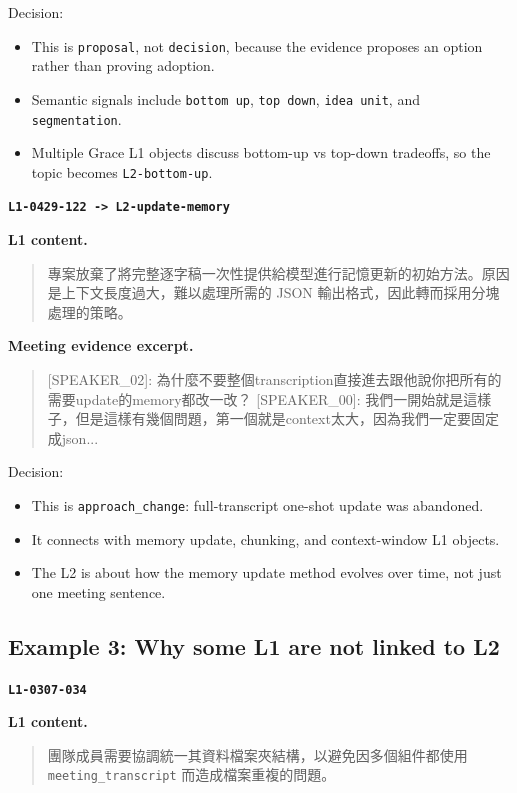 \documentclass[11pt,a4paper]{article}
\newcommand{\code}[1]{{\footnotesize\texttt{#1}}}
\begin{document}
Decision:

\begin{itemize}
  \item This is \code{proposal}, not \code{decision}, because the evidence proposes an option rather than proving adoption.
  \item Semantic signals include \code{bottom up}, \code{top down}, \code{idea unit}, and \code{segmentation}.
  \item Multiple Grace L1 objects discuss bottom-up vs top-down tradeoffs, so the topic becomes \code{L2-bottom-up}.
\end{itemize}

\textbf{\code{L1-0429-122 -> L2-update-memory}}

\textbf{L1 content.}

\begin{quote}
專案放棄了將完整逐字稿一次性提供給模型進行記憶更新的初始方法。原因是上下文長度過大，難以處理所需的 JSON 輸出格式，因此轉而採用分塊處理的策略。
\end{quote}

\textbf{Meeting evidence excerpt.}

\begin{quote}
[SPEAKER\_02]: 為什麼不要整個transcription直接進去跟他說你把所有的需要update的memory都改一改？ [SPEAKER\_00]: 我們一開始就是這樣子，但是這樣有幾個問題，第一個就是context太大，因為我們一定要固定成json...
\end{quote}

Decision:

\begin{itemize}
  \item This is \code{approach\_change}: full-transcript one-shot update was abandoned.
  \item It connects with memory update, chunking, and context-window L1 objects.
  \item The L2 is about how the memory update method evolves over time, not just one meeting sentence.
\end{itemize}

\subsection{Example 3: Why some L1 are not linked to L2}

\textbf{\code{L1-0307-034}}

\textbf{L1 content.}

\begin{quote}
團隊成員需要協調統一其資料檔案夾結構，以避免因多個組件都使用 \code{meeting\_transcript} 而造成檔案重複的問題。
\end{quote}
\end{document}
